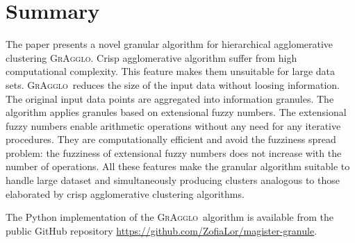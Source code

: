 \documentclass{amcs}
\newcommand{\procedura}[1]{\textsc{#1}}
\newcommand{\MojAlg}{\procedura{GrAgglo}}
\newcommand{\repo}{\url{https://github.com/ZofiaLor/magister-granule}}
\newcommand{\efn}{extensional fuzzy number}
\begin{document}
\section{Summary}

The paper presents a novel granular algorithm for hierarchical agglomerative clustering \MojAlg. 
Crisp agglomerative algorithm suffer from high computational complexity. 
This feature makes them unsuitable for large data sets. 
\MojAlg\ reduces the size of the input data without loosing information. 
The original input data points are aggregated into information granules. 
The algorithm applies granules based on \efn s.
The \efn s enable arithmetic operations with\-out any need for any iterative procedures. 
They are computationally efficient and avoid the fuzziness spread problem: the fuzziness of \efn s does not increase with the number of operations.
All these features make the granular algorithm suitable to handle large dataset and simultaneously producing clusters analogous to those elaborated by crisp agglomerative clustering algorithms.


The Python implementation of the \MojAlg\ algorithm is available from the public GitHub repository \repo.


% 

\end{document}
